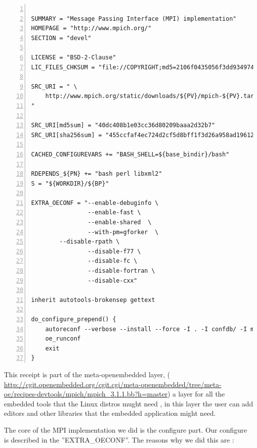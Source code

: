 \begin{lstlisting}[frame=single,numbers=left,breaklines=true,basicstyle=\tiny]

SUMMARY = "Message Passing Interface (MPI) implementation"
HOMEPAGE = "http://www.mpich.org/"
SECTION = "devel"

LICENSE = "BSD-2-Clause"
LIC_FILES_CHKSUM = "file://COPYRIGHT;md5=2106f0435056f3dd9349747a766e5816"

SRC_URI = " \
	http://www.mpich.org/static/downloads/${PV}/mpich-${PV}.tar.gz \
"

SRC_URI[md5sum] = "40dc408b1e03cc36d80209baaa2d32b7"
SRC_URI[sha256sum] = "455ccfaf4ec724d2cf5d8bff1f3d26a958ad196121e7ea26504fd3018757652d"

CACHED_CONFIGUREVARS += "BASH_SHELL=${base_bindir}/bash"

RDEPENDS_${PN} += "bash perl libxml2"
S = "${WORKDIR}/${BP}"

EXTRA_OECONF = "--enable-debuginfo \
                --enable-fast \
                --enable-shared  \
                --with-pm=gforker  \
		--disable-rpath \
                --disable-f77 \
                --disable-fc \
                --disable-fortran \
                --disable-cxx"

inherit autotools-brokensep gettext

do_configure_prepend() {
    autoreconf --verbose --install --force -I . -I confdb/ -I maint/
    oe_runconf
    exit
}

\end{lstlisting}

This receipt is part of the meta-openembedded layer, (
\url{http://cgit.openembedded.org/cgit.cgi/meta-openembedded/tree/meta-oe/recipes-devtools/mpich/mpich_3.1.1.bb?h=master})
a layer for all the embedded tools that the Linux distros mught need , in this
layer the user can add editors and other libraries that the embedded
application might need. 

The core of the MPI implementation we did is the configure part. Our configure
is described in the ''EXTRA\_OECONF''. The reasons why we did this are : 

